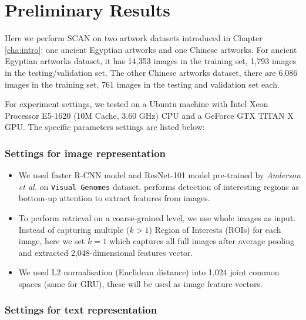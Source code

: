 
\section{Preliminary Results}
Here we perform SCAN on two artwork datasets introduced in Chapter \ref{cha:intro}: one ancient Egyptian artworks and one Chinese artworks. For ancient Egyptian artworks dataset, it has 14,353 images in the training set, 1,793 images in the testing/validation set. The other Chinese artworks dataset, there are 6,086 images in the training set, 761 images in the testing and validation set each.

For experiment settings, we tested on a Ubuntu machine with Intel Xeon Processor E5-1620 (10M Cache, 3.60 GHz) CPU and a GeForce GTX TITAN X GPU. The specific parameters settings are listed below:

\subsubsection{Settings for image representation}

\begin{itemize}
    \item We used faster R-CNN model and ResNet-101 model pre-trained by \textit{Anderson et al.} on \verb|Visual Genomes| dataset, performs detection of interesting regions as bottom-up attention to extract features from images. 
    \item To perform retrieval on a coarse-grained level, we use whole images as input. Instead of capturing multiple ($k>1$) Region of Interests (ROIs) for each image, here we set $k=1$ which captures all full images after average pooling and extracted 2,048-dimensional features vector.
    \item We used L2 normalisation (Euclidean distance) into 1,024 joint common spaces (same for GRU), these will be used as image feature vectors.
\end{itemize}

\subsubsection{Settings for text representation}

